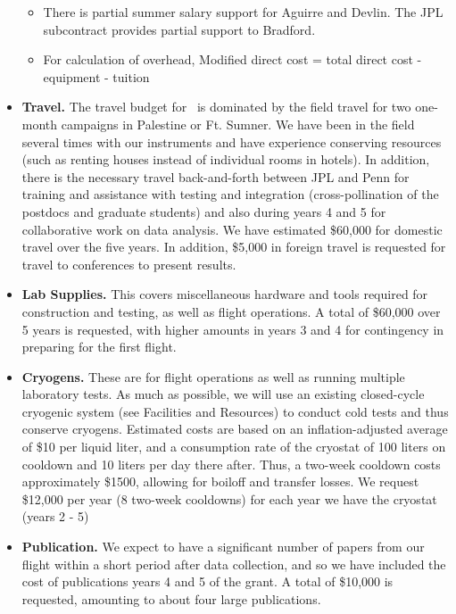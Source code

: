 \begin{itemize}
\begin{itemize}
\item
There is partial summer salary support for Aguirre and Devlin.
The JPL subcontract provides partial support to Bradford.

\item
For calculation of overhead, Modified direct cost = total direct cost -
equipment - tuition

\end{itemize}

\item
{\bf Travel.}  The travel budget for \name\ is dominated by the field travel for two one-month campaigns in Palestine or Ft. Sumner.
We have
been in the field several times with our instruments and have experience
conserving resources (such as renting houses instead of
individual rooms in hotels).  
In addition, there is the necessary travel back-and-forth between JPL and Penn for training and assistance with testing and
integration (cross-pollination of the postdocs and graduate students) and also during years 4 and 5 for collaborative work on data analysis.  We have estimated \$60,000
for domestic travel over the five years.  In addition, \$5,000 in
foreign travel is requested for travel to conferences to present results.

\item
{\bf Lab Supplies.}  This covers miscellaneous hardware and tools
required for construction and testing, as well as flight operations.
A total of \$60,000 over 5 years is requested, with higher amounts in years 3 and 4 for contingency in preparing for the first flight.

\item
{\bf Cryogens.}  These are for flight operations as well as
running multiple laboratory tests.  As much as possible, we will use
an existing closed-cycle cryogenic system (see Facilities and
Resources) to conduct cold tests and thus conserve cryogens.
Estimated costs are based on an inflation-adjusted average of \$10 per liquid liter, and a consumption rate of the cryostat of 100 liters on cooldown and 10 liters per day there after.  Thus, a two-week cooldown costs approximately \$1500, allowing for boiloff and transfer losses.   We request \$12,000 per year (8 two-week cooldowns) for each year we have the cryostat (years 2 - 5)


\item
{\bf Publication.}  
We expect to have a significant number of papers from our flight
within a short period after data collection, and so we have included
the cost of publications years 4 and 5 of the grant.  A total of
\$10,000 is requested, amounting to about four large publications.


\end{itemize}
